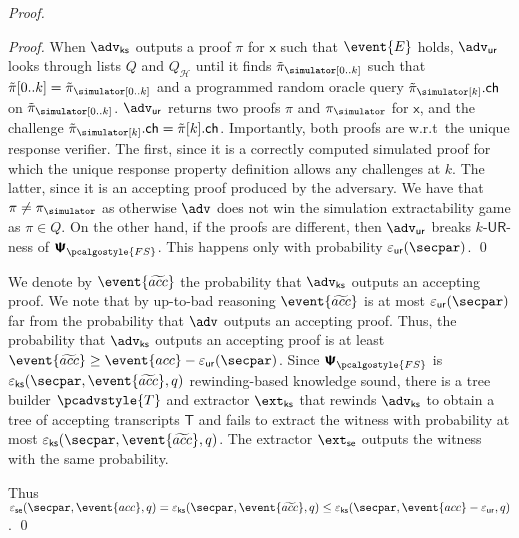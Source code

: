 \documentclass[10pt]{llncs}
\newcommand{\zkproofs}{\zkproof_\simulator}
\newcommand{\tzkproofs}{\tilde\zkproof_\simulator}
\newcommand{\pcvarstyle}[1]{\mathsf{#1}}
\newcommand{\eps}{\varepsilon}
\newcommand{\zkproof}{\pi}
\newcommand{\tzkproof}{\tilde{\zkproof}}
\newcommand{\proofsystem}{\pcschemestyle{\Psi}}
\newcommand{\psfs}{\proofsystem_\fs}
\newcommand{\ro}{\mathcal{H}}
\newcommand{\fs}{\pcalgostyle{FS}}
\newcommand{\se}{\pcvarstyle{se}}
\newcommand{\tree}{\pcvarstyle{T}}
\newcommand{\pcschemestyle}[1]{\bm{\mathsf{#1}}}
\newcommand{\tdv}{\pcadvstyle{T}}
\newcommand{\ch}{\pcvarstyle{ch}}
\newcommand{\inp}{\pcvarstyle{x}}
\newcommand{\accProb}{\event{acc}}
\newcommand{\waccProb}{\event{\widetilde{acc}}}
\newcommand{\ur}[1]{{#1\text{-}\mathsf{UR}}}
\newcommand{\extse}{\ext_\se}
\newcommand{\extcss}{\ext_{\css}}
\newcommand{\css}{\pcvarstyle{ks}}
\newcommand{\advse}{\adv}
\newcommand{\advur}{\adv_{\pcvarstyle{ur}}}
\newcommand{\advcss}{\adv_{\pcvarstyle{ks}}}
\newcommand{\epsur}{\eps_\pcvarstyle{ur}}
\newcommand{\epscss}{\eps_{\pcvarstyle{ks}}}
\newcommand{\epsse}{\eps_{\pcvarstyle{se}}}
\newcommand{\Qro}{Q_{\ro}}
\DeclareRobustCommand{\markulf}[2] {}%
\newcommand{\hamid}[2] {} %
\begin{document}
\begin{proof}
\begin{proof}
		When $\advcss$ outputs a proof $\zkproof$ for $\inp$ such that $\event{E}$ holds, $\advur$ looks through lists $Q$ and $\Qro$ until it finds $\tzkproofs[0..k]$ such that $\tzkproof[0..k] = \tzkproofs[0..k]$ and a programmed random oracle query $\tzkproofs[k].\ch$ on $\tzkproofs[0..k]$.	$\advur$ returns two proofs $\zkproof$ and $\zkproofs$ for $\inp$,
		and the challenge $\tzkproofs[k].\ch=\tzkproof[k].\ch$.
		Importantly, both proofs are  w.r.t~the unique response verifier. The first, since it is a correctly computed simulated proof for which the unique response property definition allows any challenges at $k$. The latter, since it is an accepting proof produced by the adversary.
		We have that $\zkproof \neq \zkproofs$ as otherwise $\advse$ does not win the simulation extractability game as $\zkproof \in Q$. On the other hand, if the proofs are different, then $\advur$ breaks $\ur{k}$-ness of $\psfs$. This happens only with  probability $\epsur(\secpar)$. 
		\qed
	\end{proof}
	
	We denote by $\waccProb$ the probability that $\advcss$ outputs an accepting proof. We note that by up-to-bad reasoning $\waccProb$ is at most $\epsur (\secpar)$ far from the probability that $\advse$ outputs an  accepting proof. Thus, the probability that $\advcss$ outputs an accepting proof is at least $\waccProb \geq \accProb - \epsur (\secpar)$. %
	Since $\psfs$ is $\epscss (\secpar, \waccProb,q)$ rewinding-based knowledge sound, there is a tree builder $\tdv$ and extractor $\extcss$ that rewinds $\advcss$ to obtain a tree of accepting transcripts $\tree$ and fails to extract the witness with probability at most $\epscss (\secpar, \waccProb, q)$. The extractor $\extse$ outputs the witness with the same probability.
	
	Thus $\epsse(\secpar,\accProb,q) = \epscss (\secpar, \waccProb,q) \leq \epscss(\secpar,\accProb - \epsur,q)$.
	\qed
\end{proof}
\end{document}
